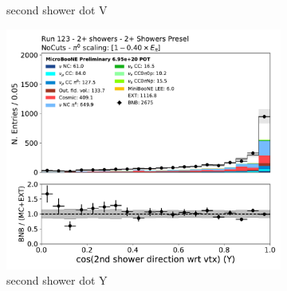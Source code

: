 \begin{figure}[H]
\begin{subfigure}{0.3\textwidth}
    \caption{second shower dot V}
    \end{subfigure}
    \begin{subfigure}{0.3\textwidth}
    \includegraphics[width=1.0\textwidth]{Sidebands/Figures/TwoShr_1e0pSel/Presel/secondshower_Y_dot.pdf}
    \caption{second shower dot Y}
    \end{subfigure}
    \caption{} 
    \label{fig:HE_1eNp_1}
\end{figure}

